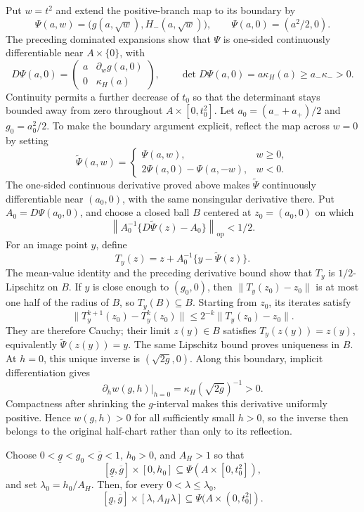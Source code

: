 Put \(w=t^2\) and extend the positive-branch map to its boundary by
\[
\Psi(a,w)=\bigl(g(a,\sqrt w),H_-(a,\sqrt w)\bigr),\qquad
\Psi(a,0)=(a^2/2,0).
\]
The preceding dominated expansions show that \(\Psi\) is one-sided continuously differentiable near \(A\times\{0\}\), with
\[
D\Psi(a,0)=\begin{pmatrix}
a&\partial_w g(a,0)\\
0&\kappa_H(a)
\end{pmatrix},\qquad
\det D\Psi(a,0)=a\kappa_H(a)\ge a_-\kappa_->0.
\]
Continuity permits a further decrease of \(t_0\) so that the determinant stays bounded away from zero throughout \(A\times[0,t_0^2]\).  Let \(a_0=(a_-+a_+)/2\) and \(g_0=a_0^2/2\).  To make the boundary argument explicit, reflect the map across \(w=0\) by setting
\[
\widetilde\Psi(a,w)=
\begin{cases}
\Psi(a,w),&w\ge0,\\
2\Psi(a,0)-\Psi(a,-w),&w<0.
\end{cases}
\]
The one-sided continuous derivative proved above makes \(\widetilde\Psi\) continuously differentiable near \((a_0,0)\), with the same nonsingular derivative there.  Put \(A_0=D\Psi(a_0,0)\), and choose a closed ball \(B\) centered at \(z_0=(a_0,0)\) on which
\[
\left\|A_0^{-1}\{D\widetilde\Psi(z)-A_0\}\right\|_{\mathrm{op}}<1/2.
\]
For an image point \(y\), define
\[
T_y(z)=z+A_0^{-1}\{y-\widetilde\Psi(z)\}.
\]
The mean-value identity and the preceding derivative bound show that \(T_y\) is \(1/2\)-Lipschitz on \(B\).  If \(y\) is close enough to \((g_0,0)\), then \(\|T_y(z_0)-z_0\|\) is at most one half of the radius of \(B\), so \(T_y(B)\subseteq B\).  Starting from \(z_0\), its iterates satisfy
\[
\|T_y^{k+1}(z_0)-T_y^k(z_0)\|\le2^{-k}\|T_y(z_0)-z_0\|.
\]
They are therefore Cauchy; their limit \(z(y)\in B\) satisfies \(T_y(z(y))=z(y)\), equivalently \(\widetilde\Psi(z(y))=y\).  The same Lipschitz bound proves uniqueness in \(B\).  At \(h=0\), this unique inverse is \((\sqrt{2g},0)\).  Along this boundary, implicit differentiation gives
\[
\left.\partial_h w(g,h)\right|_{h=0}=\kappa_H(\sqrt{2g})^{-1}>0.
\]
Compactness after shrinking the \(g\)-interval makes this derivative uniformly positive.  Hence \(w(g,h)>0\) for all sufficiently small \(h>0\), so the inverse then belongs to the original half-chart rather than only to its reflection.

Choose \(0<\underline g<g_0<\overline g<1\), \(h_0>0\), and \(A_H>1\) so that
\[
[\underline g,\overline g]\times[0,h_0]\subseteq\Psi(A\times[0,t_0^2]),
\]
and set \(\lambda_0=h_0/A_H\).  Then, for every \(0<\lambda\le\lambda_0\),
\[
[\underline g,\overline g]\times[\lambda,A_H\lambda]\subseteq
\Psi(A\times(0,t_0^2]).
\]

